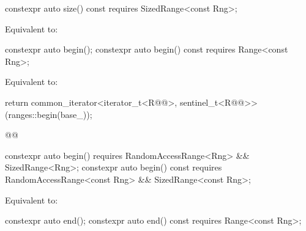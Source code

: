 {%
\begin{itemdecl}
constexpr auto size() const requires SizedRange<const Rng>;
\end{itemdecl}

\begin{itemdescr}
\pnum
\effects Equivalent to: 
\end{itemdescr}

%
\begin{itemdecl}
constexpr auto begin();
constexpr auto begin() const requires Range<const Rng>;
\end{itemdecl}

\begin{itemdescr}
\pnum
{}

\pnum
\effects Equivalent to:
\begin{codeblock}
return common_iterator<iterator_t<R@@>, sentinel_t<R@@>>(ranges::begin(base_));
\end{codeblock}
\begin{codeblock}
@@
\end{codeblock}
\end{itemdescr}

%
\begin{itemdecl}
constexpr auto begin()
  requires RandomAccessRange<Rng> && SizedRange<Rng>;
constexpr auto begin() const
  requires RandomAccessRange<const Rng> && SizedRange<const Rng>;
\end{itemdecl}

\begin{itemdescr}
\pnum
\effects Equivalent to: 
\end{itemdescr}

%
\begin{itemdecl}
constexpr auto end();
constexpr auto end() const requires Range<const Rng>;
\end{itemdecl}

\begin{itemdescr}
\pnum
{}


\end{itemdescr}}
